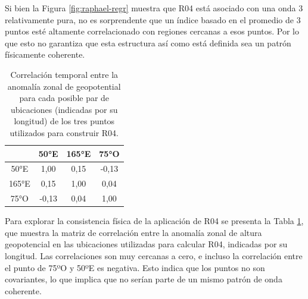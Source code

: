 \documentclass[12pt,oneside,a4paper]{reedthesis}
\begin{document}
Si bien la Figura \ref{fig:raphael-regr} muestra que R04 está asociado con una onda 3 relativamente pura, no es sorprendente que un índice basado en el promedio de 3 puntos esté altamente correlacionado con regiones cercanas a esos puntos.
Por lo que esto no garantiza que esta estructura así como está definida sea un patrón físicamente coherente.

\begin{table}

\caption{\label{tab:raphael-correlation}Correlación temporal entre la anomalía zonal de geopotential para cada posible par de ubicaciones (indicadas por su longitud) de los tres puntos utilizados para construir R04.}
\centering
\begin{tabular}[t]{cccc}
\toprule
 & 50°E & 165°E & 75°O\\
\midrule
50°E & 1,00 & 0,15 & -0,13\\
165°E & 0,15 & 1,00 & 0,04\\
75°O & -0,13 & 0,04 & 1,00\\
\bottomrule
\end{tabular}
\end{table}

Para explorar la consistencia física de la aplicación de R04 se presenta la Tabla \ref{tab:raphael-correlation}, que muestra la matriz de correlación entre la anomalía zonal de altura geopotencial en las ubicaciones utilizadas para calcular R04, indicadas por su longitud.
Las correlaciones son muy cercanas a cero, e incluso la correlación entre el punto de 75ºO y 50ºE es negativa.
Esto indica que los puntos no son covariantes, lo que implica que no serían parte de un mismo patrón de onda coherente.
\end{document}
